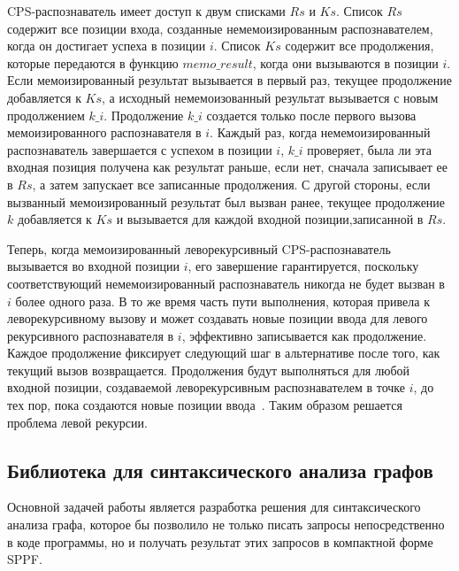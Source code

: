 CPS-распознаватель имеет доступ к двум списками $Rs$ и $Ks$. Список $Rs$ содержит все позиции входа, созданные немемоизированным распознавателем, когда он достигает успеха в позиции $i$. Список $Ks$ содержит все продолжения, которые передаются в функцию $memo\_result$, когда они вызываются в позиции $i$. Если мемоизированный результат вызывается в первый раз, текущее продолжение добавляется к $Ks$, а исходный немемоизованный результат вызывается с новым продолжением $k\_i$. Продолжение $k\_i$ создается только после первого вызова мемоизированного распознавателя в $i$. Каждый раз, когда немемоизированный распознаватель завершается с успехом в позиции $i$, $k\_i$ проверяет, была ли эта входная позиция получена как результат раньше, если нет, сначала записывает ее в $Rs$, а затем запускает все записанные продолжения. С другой стороны, если вызванный мемоизированный результат был вызван ранее, текущее
продолжение $k$ добавляется к $Ks$ и вызывается для каждой входной позиции,записанной в $Rs$.

Теперь, когда мемоизированный леворекурсивный CPS-распознаватель вызывается во входной позиции $i$, его завершение гарантируется, поскольку соответствующий немемоизированный распознаватель никогда не будет вызван в $i$ более одного раза. В то же время часть пути выполнения, которая привела к леворекурсивному вызову и может создавать новые позиции ввода для левого рекурсивного распознавателя в $i$, эффективно записывается как продолжение. Каждое продолжение фиксирует следующий шаг в альтернативе после того, как текущий вызов возвращается. Продолжения будут выполняться для любой входной позиции, создаваемой леворекурсивным распознавателем в точке $i$, до тех пор, пока создаются новые позиции ввода~\cite{IzmCombinator}. Таким образом решается проблема левой рекурсии.

\subsection{ Библиотека для синтаксического анализа графов}
Основной задачей работы является разработка решения для синтаксического анализа графа, которое бы позволило не только писать запросы непосредственно в коде программы, но и получать результат этих запросов в компактной форме SPPF.

